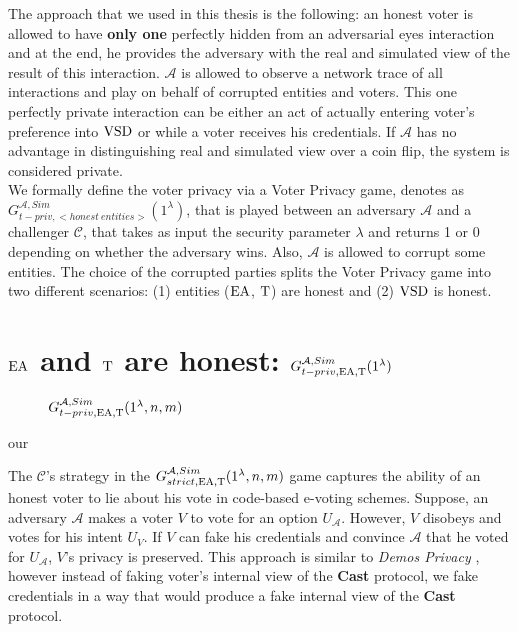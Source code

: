 The approach that we used in this thesis is the following: an honest voter is allowed to have  \textbf{only one} perfectly hidden from an adversarial eyes interaction and at the end, he provides the adversary with the real and simulated view of the result of this interaction. $\mathcal{A}$ is allowed to observe a network trace of all interactions and play on behalf of corrupted entities and voters. This one perfectly private interaction can be either an act of actually entering voter's preference into $\operatorname{VSD}$ or while a voter receives his credentials. If $\mathcal{A}$  has no advantage in distinguishing real and simulated view over a coin flip, the system is considered private. \\

We formally define the voter privacy via a Voter Privacy game, denotes as $G_{t-priv,<honest~entities>}^{\mathcal{A}, Sim}(1^{\lambda})$, that is played between an adversary $\mathcal{A}$ and a challenger $\mathcal{C}$, that takes as input the security parameter $\lambda$ and returns 1 or 0 depending on whether the adversary wins.  Also, $\mathcal{A}$ is  allowed to corrupt some entities. The choice of the corrupted parties splits the Voter Privacy game into two different scenarios: (1) entities ($\operatorname{EA}$, $\operatorname{T}$) are honest and (2) $\operatorname{VSD}$ is honest. \\

 \section{$\operatorname{EA}$ and $\operatorname{T}$ are honest: $G_{t-priv,\operatorname{EA},\operatorname{T}}^{\mathcal{A}, Sim}(1^{\lambda})$}
  \begin{figure}
 
        \caption{  $G_{t-priv,\operatorname{EA},\operatorname{T}}^{\mathcal{A}, Sim}(1^{\lambda},n,m)$}
\end{figure}our 

The $\mathcal{C}$'s strategy  in the  $G_{strict,\operatorname{EA},\operatorname{T}}^{\mathcal{A}, Sim}(1^{\lambda},n,m)$ game captures the ability of an honest voter to lie about his vote in code-based e-voting schemes. Suppose, an adversary $\mathcal{A}$ makes a voter $V$ to vote for an option $U_{\mathcal{A}}$.  However, $V$ disobeys and votes for his intent $U_{V}$. If $V$ can fake his credentials  and convince $\mathcal{A}$ that he voted for $U_{\mathcal{A}}$, $V$'s privacy is preserved. This approach is similar to \textit{Demos Privacy} \cite{Kiayias2015}, however instead of faking voter's internal view of the \textbf{Cast} protocol, we fake credentials in a way that would produce a fake internal view of the \textbf{Cast} protocol.\\

